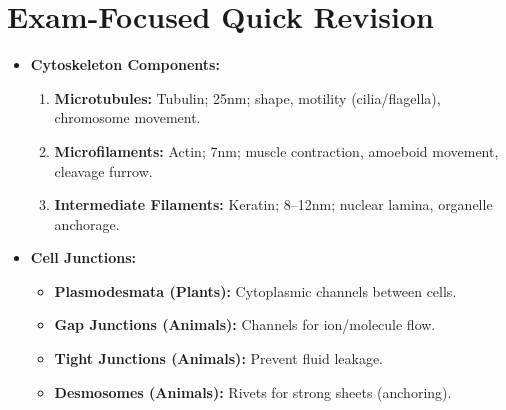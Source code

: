 \documentclass[11pt, a4paper]{article}
\begin{document}
\section*{Exam-Focused Quick Revision}
\begin{itemize}
    \item \textbf{Cytoskeleton Components:}
    \begin{enumerate}
        \item \textbf{Microtubules:} Tubulin; 25nm; shape, motility (cilia/flagella), chromosome movement.
        \item \textbf{Microfilaments:} Actin; 7nm; muscle contraction, amoeboid movement, cleavage furrow.
        \item \textbf{Intermediate Filaments:} Keratin; 8--12nm; nuclear lamina, organelle anchorage.
    \end{enumerate}
    \item \textbf{Cell Junctions:}
    \begin{itemize}
        \item \textbf{Plasmodesmata (Plants):} Cytoplasmic channels between cells.
        \item \textbf{Gap Junctions (Animals):} Channels for ion/molecule flow.
        \item \textbf{Tight Junctions (Animals):} Prevent fluid leakage.
        \item \textbf{Desmosomes (Animals):} Rivets for strong sheets (anchoring).
    \end{itemize}
\end{itemize}
\end{document}
